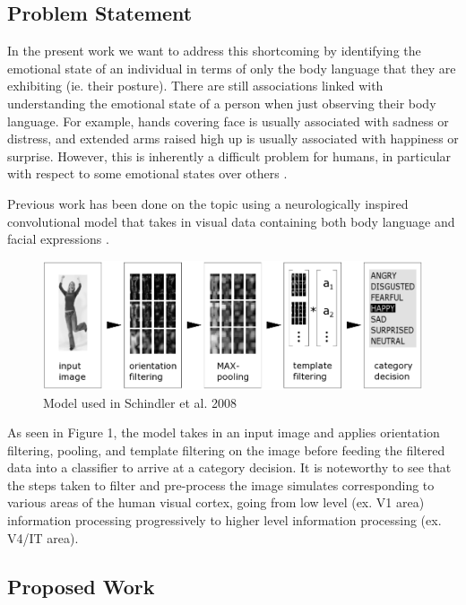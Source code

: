 \documentclass{article}
\begin{document}
\subsection{Problem Statement}

In the present work we want to address this shortcoming by identifying the emotional state of an individual in terms of only the body language that they are exhibiting (ie. their posture). There are still associations linked with understanding the emotional state of a person when just observing their body language. For example, hands covering face is usually associated with sadness or distress, and extended arms raised high up is usually associated with happiness or surprise. However, this is inherently a difficult problem for humans, in particular with respect to some emotional states over others \citep{schindler2008recognizing}\citep{de2011bodily}. 

Previous work has been done on the topic using a neurologically inspired convolutional model that takes in visual data containing both body language and facial expressions \citep{schindler2008recognizing}.

\begin{figure}[h]
	\centering
	\includegraphics[scale=0.3]{schindlernet}
	\caption{Model used in Schindler et al. 2008}
\end{figure}

As seen in Figure 1, the model takes in an input image and applies orientation filtering, pooling, and template filtering on the image before feeding the filtered data into a classifier to arrive at a category decision. It is noteworthy to see that the steps taken to filter and pre-process the image simulates corresponding to various areas of the human visual cortex, going from low level (ex. V1 area) information processing progressively to higher level information processing (ex. V4/IT area).

\subsection{Proposed Work}
\end{document}
